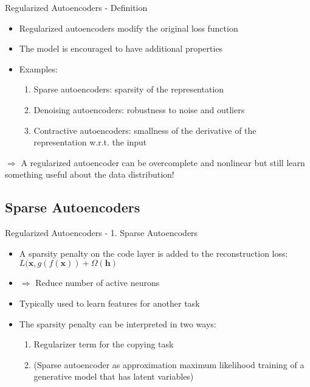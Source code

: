 \documentclass[handout]{beamer}
\begin{document}
\begin{frame}[t]{Regularized Autoencoders - Definition}
   \begin{itemize}
       \item Regularized autoencoders modify the original loss function
           \pause
       \item The model is encouraged to have additional properties
           \pause
        \item Examples:
            \begin{enumerate}
                \item Sparse autoencoders: sparsity of the representation
                    \pause
                \item Denoising autoencoders: robustness to noise and outliers
                    \pause
                \item Contractive autoencoders: smallness of the derivative of the representation w.r.t. the input
                    \pause
            \end{enumerate}
            \pause
    \end{itemize} 
    $\Rightarrow$ 
    A regularized autoencoder can be overcomplete and nonlinear but still learn something useful about the data distribution!
\end{frame}


\subsection{Sparse Autoencoders}
\begin{frame}[t]{Regularized Autoencoders - 1. Sparse Autoencoders}
   \begin{itemize}
       \item A sparsity penalty on the code layer  is added to the reconstruction loss: $L(\pmb{x}, g(f(\pmb{x})) + \Omega{(\pmb{h})}$
           \pause
       \item $\Rightarrow$ Reduce number of active neurons
          \pause 
       \item Typically used to learn features for another task
           \pause
       \item The sparsity penalty can be interpreted in two ways:
           \begin{enumerate}
               \item Regularizer term for the copying task
                   \pause
               \item (Sparse autoencoder as approximation maximum likelihood training of a generative model that has latent variables)
           \end{enumerate}
   \end{itemize} 
\end{frame}
\end{document}
